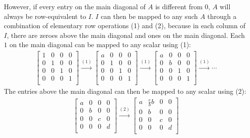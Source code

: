 \documentclass[12pt]{article}
\begin{document}
\begin{enumerate}
    However, if every entry on the main diagonal of $A$ is
    different from $0$, $A$ will always be row-equivalent to $I$.
    $I$ can then be mapped to any such $A$ through a combination
    of elementary row operations (1) and (2), because in each
    column of $I$, there are zeroes above the main diagonal and
    ones on the main diagonal. Each $1$ on the main diagonal can
    be mapped to any scalar using (1):
    \begin{align*}
      \begin{bmatrix}
        1 & 0 & 0 & 0\\
        0 & 1 & 0 & 0\\
        0 & 0 & 1 & 0\\
        0 & 0 & 0 & 1\\
      \end{bmatrix}
      \xrightarrow{(1)}
      \begin{bmatrix}
        a & 0 & 0 & 0\\
        0 & 1 & 0 & 0\\
        0 & 0 & 1 & 0\\
        0 & 0 & 0 & 1\\
      \end{bmatrix}
      \xrightarrow{(1)}
      \begin{bmatrix}
        a & 0 & 0 & 0\\
        0 & b & 0 & 0\\
        0 & 0 & 1 & 0\\
        0 & 0 & 0 & 1\\
      \end{bmatrix}
      \xrightarrow{(1)}\cdots
    \end{align*}
    The entries above the main diagonal can then be mapped to any
    scalar using (2):
    \begin{align*}
      \begin{bmatrix}
        a & 0 & 0 & 0\\
        0 & b & 0 & 0\\
        0 & 0 & c & 0\\
        0 & 0 & 0 & d\\
      \end{bmatrix}
      \xrightarrow{(2)}
      \begin{bmatrix}
        a & \frac{e}{b}b & 0 & 0\\
        0 & b & 0 & 0\\
        0 & 0 & c & 0\\
        0 & 0 & 0 & d\\

\end{bmatrix}
\end{align*}
\end{enumerate}
\end{document}
